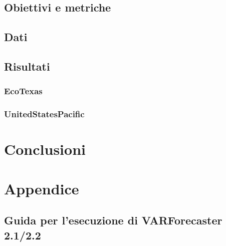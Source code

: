 \documentclass[12pt,a4paper,twoside,openright]{book}
\begin{document}
\section{Obiettivi e metriche}
\newpage
\section{Dati}
\newpage
\section{Risultati}
\newpage
\subsection{EcoTexas}
\newpage
\subsection{UnitedStatesPacific}

\chapter{Conclusioni}
\chapter{Appendice}
\section{Guida per l’esecuzione di VARForecaster 2.1/2.2}\
\end{document}
